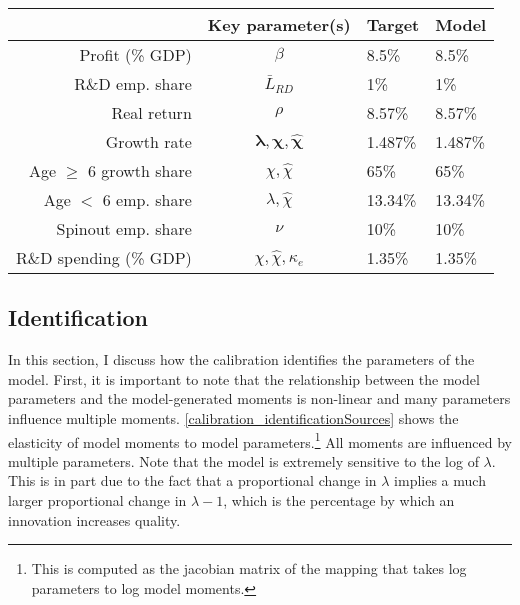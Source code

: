 \documentclass[ecta,nameyear,final]{econsocart}
\theoremstyle{plain}
\theoremstyle{remark}
\begin{document}
\begin{table}[]
	\centering
	\label{calibration_targets}
	\begin{tabular}{rcll}
		\toprule \toprule
		& Key parameter(s) & Target & Model \tabularnewline
		\midrule
		Profit (\% GDP) & $\beta$ & 8.5\% & 8.5\% 
		\tabularnewline
		R\&D emp. share & $\bar{L}_{RD}$ & 1\% & 1\% 
		\tabularnewline
		Real return & $\rho$ & 8.57\% & 8.57\% 
		\tabularnewline
		Growth rate & $\mathbf{\lambda, \chi, \hat{\chi}}$ & 1.487\% & 1.487\%
		\tabularnewline		
		Age $\ge$ 6 growth share & $\chi, \hat{\chi}$  & 65\% & 65\%
		\tabularnewline
		Age $<$ 6 emp. share  & $\lambda, \hat{\chi}$ & 13.34\% & 13.34\%
		\tabularnewline
		Spinout emp. share &$\nu$  & 10\% & 10\%
		\tabularnewline
		R\&D spending (\% GDP) & $\chi, \hat{\chi}, \kappa_e$  & 1.35\% & 1.35\%
		\tabularnewline
		\bottomrule
	\end{tabular}
\end{table}

\normalsize

\subsection{Identification}\label{subsec:identification}

In this section, I discuss how the calibration identifies the parameters of the model. First, it is important to note that the relationship between the model parameters and the model-generated moments is non-linear and many parameters influence multiple moments. \autoref{calibration_identificationSources} shows the elasticity of model moments to model parameters.\footnote{This is computed as the jacobian matrix of the mapping that takes log parameters to log model moments.} All moments are influenced by multiple parameters. Note that the model is extremely sensitive to the log of $\lambda$. This is in part due to the fact that a proportional change in $\lambda$ implies a much larger proportional change in $\lambda -1$, which is the percentage by which an innovation increases quality. 
\end{document}
